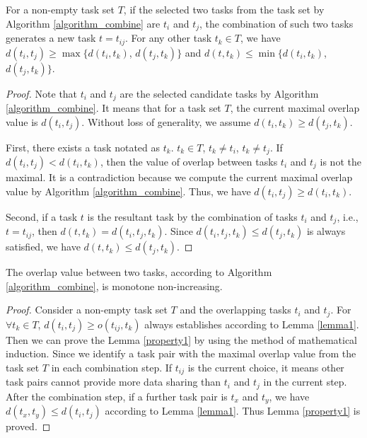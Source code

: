 \documentclass[prodmode,acmtosn]{acmsmall}
\begin{document}
\begin{lemma}
\label{lemma1}
For a non-empty task set $T$, if the selected two tasks from the task set by Algorithm \ref{algorithm_combine} are $t_i$ and $t_j$, the combination of such two tasks generates a new task $t\mathrm{=}t_{ij}$. For any other task $t_k  \mathrm{\in} T$, we have $d(t_i,t_j) \mathrm{\geq} \mathrm{\max} \{$$d(t_i,t_k)$, $d(t_j,t_k)$$\}$ and $d(t,t_k)\mathrm{\le}\min\{d(t_i,t_k)$, $d(t_j,t_k)\}$.
\end{lemma}

\begin{proof}
Note that $t_i$ and $t_j$ are the selected candidate tasks by Algorithm \ref{algorithm_combine}. It means that for a task set $T$, the current maximal overlap value is $d(t_i,t_j)$. Without loss of generality, we assume $d(t_i,t_k)\mathrm{\ge} d(t_j,t_k)$.

First, there exists a task notated as $t_k$. $t_k \mathrm{\in} T$, $t_k \mathrm{\neq} t_i$, $t_k \mathrm{\neq} t_j$. If $d(t_i,t_j)\mathrm{<}d(t_i,t_k)$, then the value of overlap between tasks $t_i$ and $t_j$ is not the maximal. It is a contradiction because we compute the current maximal overlap value by Algorithm \ref{algorithm_combine}. Thus, we have $d(t_i,t_j)\mathrm{\geq} d(t_i,t_k)$.

Second, if a task $t$ is the resultant task by the combination of tasks $t_i$ and $t_j$, i.e., $t\mathrm{=}t_{ij}$, then $d(t,t_k)\mathrm{=}d(t_i,t_j,t_k)$. Since $d(t_i,t_j,t_k)\mathrm{\le} d(t_j,t_k)$ is always satisfied, we have $d(t,t_k)\mathrm{\le} d(t_j,t_k)$.
\end{proof}

\begin{lemma}
\label{property1}
The overlap value between two tasks, according to Algorithm \ref{algorithm_combine}, is monotone non-increasing.
\end{lemma}

\begin{proof}
Consider a non-empty task set $T$  and the overlapping tasks $t_i$ and $t_j$. For $\forall t_k \mathrm{\in} T$, $d(t_i,t_j)\mathrm{\ge}o(t_{ij},t_k)$ always establishes according to Lemma \ref{lemma1}. Then we can prove the Lemma \ref{property1} by using the method of mathematical induction. Since we identify  a task pair with the maximal overlap value from the task set $T$ in each combination step. If $t_{ij}$ is the current choice, it means other task pairs cannot provide more data sharing than $t_i$ and $t_j$ in the current step. After the combination step, if a further task pair is $t_x$ and $t_y$, we have $d(t_x,t_y)\mathrm{\le} d(t_i,t_j)$  according to Lemma \ref{lemma1}. Thus Lemma \ref{property1} is proved.
\end{proof}
\end{document}
